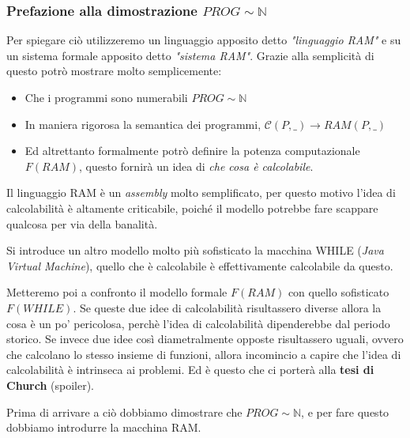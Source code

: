 \documentclass{article}
\begin{document}
\subsubsection{Prefazione alla dimostrazione $PROG\sim\mathbb{N}$}
Per spiegare ciò utilizzeremo un linguaggio apposito detto
\textit{"linguaggio RAM"} e su un sistema formale apposito detto \textit{"sistema RAM"}.
Grazie alla semplicità di questo potrò mostrare molto semplicemente:
\begin{itemize}
    \item Che i programmi sono numerabili $PROG\sim\mathbb{N}$
    \item In maniera rigorosa la semantica dei programmi, $\mathcal{C}(P,\_)\rightarrow RAM(P,\_)$
    \item Ed altrettanto formalmente potrò definire la potenza computazionale $F(RAM)$, questo fornirà
          un idea di \textit{che cosa è calcolabile}.
\end{itemize}
Il linguaggio RAM è un \textit{assembly} molto semplificato, per questo motivo l'idea di
calcolabilità è altamente criticabile, poiché il modello potrebbe fare scappare qualcosa
per via della banalità.

Si introduce un altro modello molto più sofisticato la macchina WHILE (\textit{Java Virtual Machine}), quello
che è calcolabile è effettivamente calcolabile da questo.

Metteremo poi a confronto il modello formale $F(RAM)$ con quello sofisticato $F(WHILE)$. Se
queste due idee di calcolabilità risultassero diverse allora la cosa è un po'
pericolosa, perchè l'idea di calcolabilità dipenderebbe dal periodo storico.
Se invece due idee così diametralmente opposte risultassero uguali, ovvero che calcolano
lo stesso insieme di funzioni, allora incomincio a capire che l'idea di calcolabilità è intrinseca
ai problemi. Ed è questo che ci porterà alla \textbf{tesi di Church} (spoiler).

Prima di arrivare a ciò dobbiamo dimostrare che $PROG\sim\mathbb{N}$, e per fare questo dobbiamo
introdurre la macchina RAM.
\end{document}
